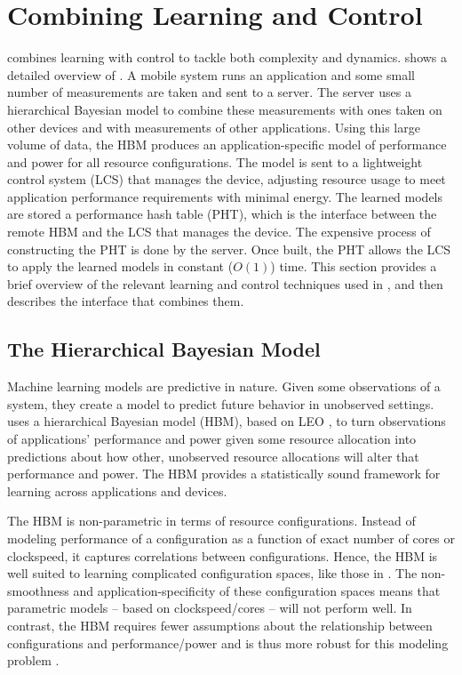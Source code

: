 \section{Combining Learning and Control}
\label{sec:framework}

\SYSTEM{} combines learning with control to tackle both complexity and
dynamics.   shows a detailed overview of
\SYSTEM{}.  A mobile system runs an application and some small number
of measurements are taken and sent to a server. The server uses a
hierarchical Bayesian model to combine these measurements with ones
taken on other devices and with measurements of other applications.
Using this large volume of data, the HBM produces an
application-specific model of performance and power for all resource
configurations.  The model is sent to a lightweight control system
(LCS) that manages the device, adjusting resource usage to meet
application performance requirements with minimal energy.  The learned
models are stored a performance hash table (PHT), which is the
interface between the remote HBM and the LCS that manages the device.
The expensive process of constructing the PHT is done by the server.
Once built, the PHT allows the LCS to apply the learned models in
constant ($O(1)$) time.  This section provides a brief overview of the
relevant learning and control techniques used in \SYSTEM{}, and then
describes the interface that combines them.

\subsection{The Hierarchical Bayesian Model}
\label{sec:framework:HBM}


Machine learning models are predictive in nature.  Given some
observations of a system, they create a model to predict future
behavior in unobserved settings. \SYSTEM{} uses a hierarchical
Bayesian model (HBM), based on LEO \cite{LEO}, to turn observations of
applications' performance and power given some resource allocation
into predictions about how other, unobserved resource allocations will
alter that performance and power.  The HBM provides a statistically
sound framework for learning across applications and devices.

The HBM is non-parametric in terms of resource configurations. Instead
of modeling performance of a configuration as a function of exact
number of cores or clockspeed, it captures correlations between
configurations.  Hence, the HBM is well suited to learning complicated
configuration spaces, like those in
.  The non-smoothness
and application-specificity of these configuration spaces means that
parametric models -- based on clockspeed/cores -- will not perform
well.  In contrast, the HBM requires fewer assumptions about the
relationship between configurations and performance/power and is thus
more robust for this modeling problem \cite{LEO}.

